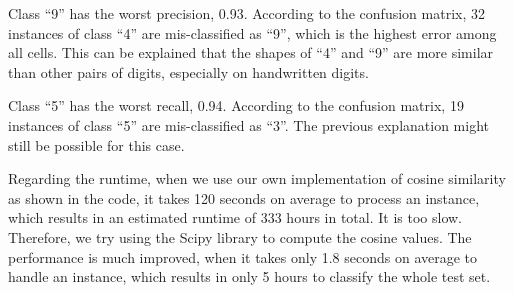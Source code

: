 Class ``9'' has the worst precision, 0.93. According to the confusion matrix, 32 instances of class ``4'' are mis-classified as ``9'', which is the highest error among all cells. This can be explained that the shapes of ``4'' and ``9'' are more similar than other pairs of digits, especially on handwritten digits.

Class ``5'' has the worst recall, 0.94. According to the confusion matrix, 19 instances of class ``5'' are mis-classified as ``3''. The previous explanation might still be possible for this case.

Regarding the runtime, when we use our own implementation of cosine similarity as shown in the code, it takes 120 seconds on average to process an instance, which results in an estimated runtime of 333 hours in total. It is too slow. Therefore, we try using the Scipy library to compute the cosine values. The performance is much improved, when it takes only 1.8 seconds on average to handle an instance, which results in only 5 hours to classify the whole test set. 

